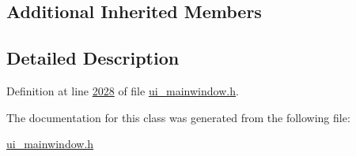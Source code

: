 \subsection*{Additional Inherited Members}


\subsection{Detailed Description}


Definition at line \hyperlink{a00052_source_l02028}{2028} of file \hyperlink{a00052_source}{ui\+\_\+mainwindow.\+h}.



The documentation for this class was generated from the following file\+:\begin{DoxyCompactItemize}
\item 
\hyperlink{a00052}{ui\+\_\+mainwindow.\+h}\end{DoxyCompactItemize}
